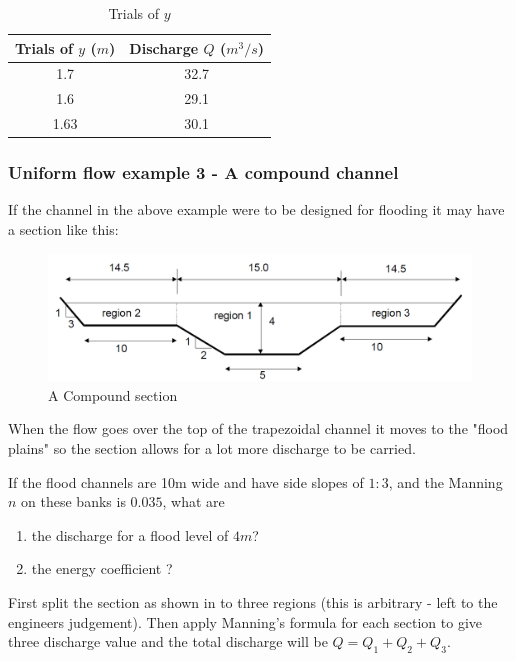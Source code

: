 \documentclass[a4paper, 12pt, british]{article} %
\numberwithin{equation}{section}
\numberwithin{figure}{section}
\numberwithin{table}{section}
\begin{document}
\begin{table}[H]
	\centering
	\begin{tabular}{cc}
		\hline
		Trials of $y$ ($m$) &Discharge $Q$ ($m^3/s$) \\
		\hline
		1.7	&32.7\\
		1.6	&29.1\\
		1.63&	30.1\\
		\hline
	\end{tabular}
	\caption{Trials of $y$}
	\label{tab:ex21}
\end{table}

\subsubsection{Uniform flow example 3 - A compound channel}

If the channel in the above example were to be designed for flooding it may have a section like this:

\begin{figure}[H]
	\centering
	\includegraphics[scale=0.5]{./images/fig_eg41.png}
	\caption{A Compound section}
	\label{fig:eg41}
\end{figure}
When the flow goes over the top of the trapezoidal channel it moves to the "flood plains" so the section allows for a lot more discharge to be carried.

If the flood channels are 10m wide and have side slopes of $1:3$, and the Manning $n$ on these banks is $0.035$, what are
\begin{enumerate}[label=\alph*,noitemsep]
	\item the discharge for a flood level of $4m$?
	\item the energy coefficient ?
\end{enumerate}
First split the section as shown in to three regions (this is arbitrary - left to the engineers judgement). 
Then apply Manning's formula for each section to give three discharge value and the total discharge will be $Q = Q_1 + Q_2 + Q_3$.
\end{document}
